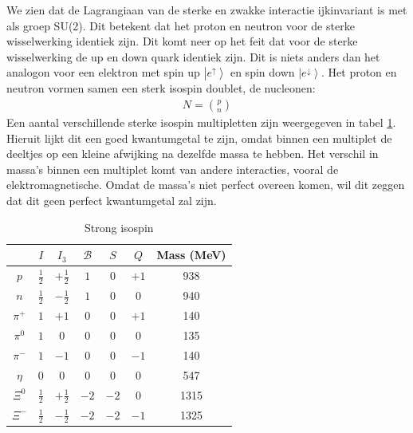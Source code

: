 \documentclass[../main.tex]{subfiles}
\begin{document}
We zien dat de Lagrangiaan van de sterke en zwakke interactie ijkinvariant is met als groep SU(2). Dit betekent dat het proton en neutron voor de sterke wisselwerking identiek zijn. Dit komt neer op het feit dat voor de sterke wisselwerking de up en down quark identiek zijn. Dit is niets anders dan het analogon voor een elektron met spin up $\left|e^\uparrow\right>$ en spin down $\left|e^\downarrow\right>$. Het proton en neutron vormen samen een sterk isospin doublet, de nucleonen:
\begin{equation}
    \begin{aligned}
        \label{eq:nucleonen}
        N = \binom{p}{n}
    \end{aligned}
\end{equation}
Een aantal verschillende sterke isospin multipletten zijn weergegeven in tabel \ref{tab:strong_isospin}. Hieruit lijkt dit een goed kwantumgetal te zijn, omdat binnen een multiplet de deeltjes op een kleine afwijking na dezelfde massa te hebben. Het verschil in massa's binnen een multiplet komt van andere interacties, vooral de elektromagnetische. Omdat de massa's niet perfect overeen komen, wil dit zeggen dat dit geen perfect kwantumgetal zal zijn.

\begin{table}[h]
    \centering
    \caption{Strong isospin}
    \label{tab:strong_isospin}
    \begin{tabular}{c||cc|c|c|c|c}
                & $I$           & $I_3$         & $\mathcal{B}$ & $S$   & $Q$   & Mass (MeV)\\
        \hline
        $p$     & $\frac{1}{2}$ & $+\frac{1}{2}$& $1$           & $0$   & $+1$  & 938       \\
        $n$     & $\frac{1}{2}$ & $-\frac{1}{2}$& $1$           & $0$   & $0$   & 940       \\
        \hline
        $\pi^+$ & $1$           & $+1$          & $0$           & $0$   & $+1$  & 140       \\
        $\pi^0$ & $1$           & $0$           & $0$           & $0$   & $0$   & 135       \\
        $\pi^-$ & $1$           & $-1$          & $0$           & $0$   & $-1$  & 140       \\
        \hline
        $\eta$  & $0$           & $0$           & $0$           & $0$   & $0$   & 547       \\
        \hline
        $\Xi^0$ & $\frac{1}{2}$ & $+\frac{1}{2}$& $-2$          & $-2$  & $0$   & 1315      \\
        $\Xi^-$ & $\frac{1}{2}$ & $-\frac{1}{2}$& $-2$          & $-2$  & $-1$  & 1325      \\
    \end{tabular}
\end{table}
\end{document}
